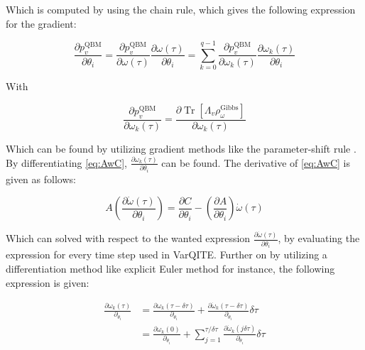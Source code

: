 \documentclass[../main.tex]{subfiles}
\begin{document}
Which is computed by using the chain rule, which gives the following expression for the gradient:

\begin{equation}
\frac{\partial p_{v}^{\mathrm{QBM}}}{\partial \theta_{i}} =\frac{\partial p_{v}^{\mathrm{QBM}}}{\partial \omega(\tau)} \frac{\partial \omega(\tau)}{\partial \theta_{i}}=\sum_{k=0}^{q-1} \frac{\partial p_{v}^{\mathrm{QBM}}}{\partial \omega_{k}(\tau)} \frac{\partial \omega_{k}(\tau)}{\partial \theta_{i}}
\end{equation}

With 

\begin{equation}
\frac{\partial p_{v}^{\mathrm{QBM}}}{\partial \omega_{k}(\tau)}=\frac{\partial \operatorname{Tr}\left[\Lambda_{v} \rho_{\omega}^{\mathrm{Gibbs}}\right]}{\partial \omega_{k}(\tau)}
\end{equation}

Which can be found by utilizing gradient methods like the parameter-shift rule \cite{crooks2019gradients}. By differentiating \autoref{eq:AwC}, $\frac{\partial \omega_{k}(\tau)}{ \partial \theta_{i}}$ can be found. The derivative of \autoref{eq:AwC} is given as follows:

\begin{equation}
A\left(\frac{\partial \dot{\omega}(\tau)}{\partial \theta_{i}}\right)=\frac{\partial C}{\partial \theta_{i}}-\left(\frac{\partial A}{\partial \theta_{i}}\right) \dot{\omega}(\tau)
\end{equation}

Which can solved with respect to the wanted expression $\frac{\partial \dot{\omega}(\tau)}{ \partial \theta_{i}}$, by evaluating the expression for every time step used in VarQITE. Further on by utilizing a differentiation method like explicit Euler method for instance, the following expression is given:

\begin{equation}
\begin{aligned}
\frac{\partial \omega_{k}(\tau)}{\partial_{\theta_{i}}} &=\frac{\partial \omega_{k}(\tau-\delta \tau)}{\partial_{\theta_{i}}}+\frac{\partial \dot{\omega}_{k}(\tau-\delta \tau)}{\partial_{\theta_{i}}} \delta \tau \\
&=\frac{\partial \omega_{k}(0)}{\partial_{\theta_{i}}}+\sum_{j=1}^{\tau / \delta \tau} \frac{\partial \dot{\omega}_{k}(j \delta \tau)}{\partial_{\theta_{i}}} \delta \tau
\end{aligned}
\end{equation}
\end{document}
